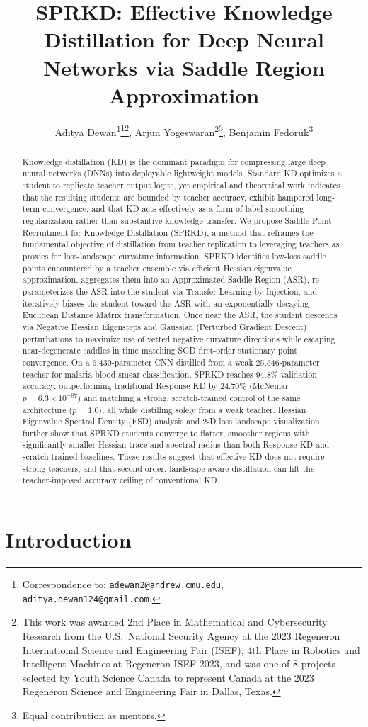 \documentclass[letterpaper]{article}
\title{SPRKD: Effective Knowledge Distillation for Deep Neural Networks via Saddle Region Approximation}
\author{
    Aditya Dewan\textsuperscript{\rm 1}\thanks{Correspondence to: \texttt{adewan2@andrew.cmu.edu}, \texttt{aditya.dewan124@gmail.com}.}\thanks{This work was awarded 2nd Place in Mathematical and Cybersecurity Research from the U.S.~National Security Agency at the 2023 Regeneron International Science and Engineering Fair (ISEF), 4th Place in Robotics and Intelligent Machines at Regeneron ISEF 2023, and was one of 8 projects selected by Youth Science Canada to represent Canada at the 2023 Regeneron Science and Engineering Fair in Dallas, Texas.},
    Arjun Yogeswaran\textsuperscript{\rm 2}\thanks{Equal contribution as mentors.},
    Benjamin Fedoruk\textsuperscript{\rm 3}\footnotemark[3]
}
\begin{document}
\maketitle

\begin{abstract}
Knowledge distillation (KD) is the dominant paradigm for compressing large deep neural networks (DNNs) into deployable lightweight models. Standard KD optimizes a student to replicate teacher output logits, yet empirical and theoretical work indicates that the resulting students are bounded by teacher accuracy, exhibit hampered long-term convergence, and that KD acts effectively as a form of label-smoothing regularization rather than substantive knowledge transfer. We propose Saddle Point Recruitment for Knowledge Distillation (SPRKD), a method that reframes the fundamental objective of distillation from teacher replication to leveraging teachers as proxies for loss-landscape curvature information. SPRKD identifies low-loss saddle points encountered by a teacher ensemble via efficient Hessian eigenvalue approximation, aggregates them into an Approximated Saddle Region (ASR), re-parameterizes the ASR into the student via Transfer Learning by Injection, and iteratively biases the student toward the ASR with an exponentially decaying Euclidean Distance Matrix transformation. Once near the ASR, the student descends via Negative Hessian Eigensteps and Gaussian (Perturbed Gradient Descent) perturbations to maximize use of vetted negative curvature directions while escaping near-degenerate saddles in time matching SGD first-order stationary point convergence. On a 6{,}430-parameter CNN distilled from a weak 25{,}546-parameter teacher for malaria blood smear classification, SPRKD reaches 94.8\% validation accuracy, outperforming traditional Response KD by 24.70\% (McNemar $p = 6.3 \times 10^{-87}$) and matching a strong, scratch-trained control of the same architecture ($p = 1.0$), all while distilling solely from a weak teacher. Hessian Eigenvalue Spectral Density (ESD) analysis and 2-D loss landscape visualization further show that SPRKD students converge to flatter, smoother regions with significantly smaller Hessian trace and spectral radius than both Response KD and scratch-trained baselines. These results suggest that effective KD does not require strong teachers, and that second-order, landscape-aware distillation can lift the teacher-imposed accuracy ceiling of conventional KD.
\end{abstract}

\section{Introduction}
\end{document}
